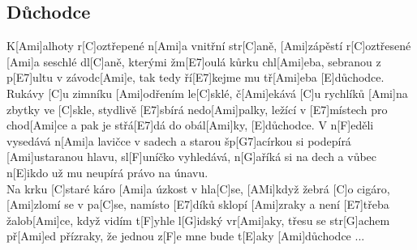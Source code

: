 \documentclass[12pt]{article}
\begin{document}
\subsection{Důchodce}
\begin{multicols}{2}
	K[Ami]alhoty r[C]oztřepené n[Ami]a vnitřní str[C]aně,
	[Ami]zápěstí r[C]oztřesené [Ami]a seschlé dl[C]aně,
	kterými žm[E7]oulá kůrku chl[Ami]eba,
	sebranou z p[E7]ultu v závodc[Ami]e,
	tak tedy ří[E7]kejme mu tř[Ami]eba [E]důchodce.
	\\
	[Ami]Rukávy [C]u zimníku [Ami]odřením le[C]sklé,
	č[Ami]ekává [C]u rychlíků [Ami]na zbytky ve [C]skle,
	stydlivě [E7]sbírá nedo[Ami]palky,
	ležící v [E7]místech pro chod[Ami]ce
	a pak je střá[E7]dá do obál[Ami]ky, [E]důchodce.
	\columnbreak
	V n[F]eděli vysedává n[Ami]a lavičce v sadech
	a starou šp[G7]acírkou
	 si podepírá [Ami]ustaranou hlavu,
	sl[F]uníčko vyhledává, n[G]aříká si na dech
	a vůbec n[E]ikdo už mu neupírá právo na únavu.
	\\
	[Ami]Na krku [C]staré káro [Ami]a úzkost v hla[C]se,
	[AMi]když žebrá [C]o cigáro, [Ami]zlomí se v pa[C]se,
	namísto [E7]díků sklopí [Ami]zraky 
	a není [E7]třeba žalob[Ami]ce,
	když vidím t[F]yhle l[G]idský vr[Ami]aky, 
	třesu se str[G]achem př[Ami]ed přízraky,
	že jednou z[F]e mne bude t[E]aky [Ami]důchodce ...
\end{multicols}
\end{document}
